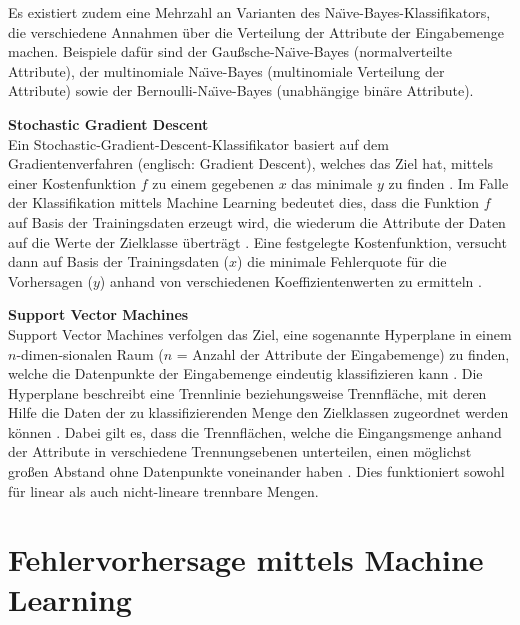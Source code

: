 Es existiert zudem eine Mehrzahl an Varianten des Na\"{\i}ve-Bayes-Klassifikators, die verschiedene Annahmen über die Verteilung der Attribute der Eingabemenge machen. Beispiele dafür sind der Gaußsche-Na\"{\i}ve-Bayes (normalverteilte Attribute), der multinomiale Na\"{\i}ve-Bayes (multinomiale Verteilung der Attribute) sowie der Bernoulli-Na\"{\i}ve-Bayes (unabhängige binäre Attribute).

\textbf{Stochastic Gradient Descent\medskip}\\
Ein Stochastic-Gradient-Descent-Klassifikator basiert auf dem Gradientenverfahren (englisch: Gradient Descent), welches das Ziel hat, mittels einer Kostenfunktion $f$ zu einem gegebenen $x$ das minimale $y$ zu finden \cite{Srinivasan2019}. Im Falle der Klassifikation mittels Machine Learning bedeutet dies, dass die Funktion $f$ auf Basis der Trainingsdaten erzeugt wird, die wiederum die Attribute der Daten auf die Werte der Zielklasse überträgt \cite{Diab2019}. Eine festgelegte Kostenfunktion, versucht dann auf Basis der Trainingsdaten ($x$) die minimale Fehlerquote für die Vorhersagen ($y$) anhand von verschiedenen Koeffizientenwerten zu ermitteln \cite{Diab2019}.

\textbf{Support Vector Machines\medskip}\\
Support Vector Machines verfolgen das Ziel, eine sogenannte \glqq Hyperplane\grqq{} in einem $n$-dimen-sionalen Raum ($n$ = Anzahl der Attribute der Eingabemenge) zu finden, welche die Datenpunkte der Eingabemenge eindeutig klassifizieren kann \cite{Gandhi2018}. Die Hyperplane beschreibt eine Trennlinie beziehungsweise Trennfläche, mit deren Hilfe die Daten der zu klassifizierenden Menge den Zielklassen zugeordnet werden können \cite{Luber2019}. Dabei gilt es, dass die Trennflächen, welche die Eingangsmenge anhand der Attribute in verschiedene Trennungsebenen unterteilen, einen möglichst großen Abstand ohne Datenpunkte voneinander haben \cite{Luber2019}. Dies funktioniert sowohl für linear als auch nicht-lineare trennbare Mengen.

\section{Fehlervorhersage mittels Machine Learning}
\label{ml-background}

